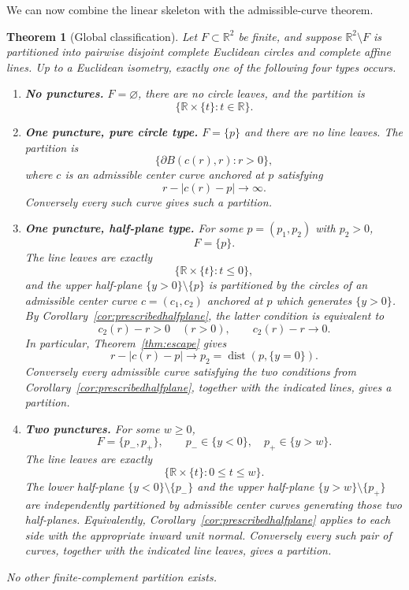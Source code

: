 \documentclass[11pt]{article}
\newtheorem{theorem}{Theorem}[section]
\newcommand{\R}{\mathbb{R}}
\DeclareMathOperator{\dist}{dist}
\begin{document}
We can now combine the linear skeleton with the admissible-curve theorem.

\begin{theorem}[Global classification]\label{thm:global}
Let $F\subset\R^2$ be finite, and suppose $\R^2\setminus F$ is partitioned into pairwise disjoint complete Euclidean circles and complete affine lines. Up to a Euclidean isometry, exactly one of the following four types occurs.

\begin{enumerate}[label=\textup{(\Roman*)},leftmargin=2.4em]
\item \textbf{No punctures.} $F=\varnothing$, there are no circle leaves, and the partition is
\[
\{\R\times\{t\}:t\in\R\}.
\]

\item \textbf{One puncture, pure circle type.} $F=\{p\}$ and there are no line leaves. The partition is
\[
\{\partial B(c(r),r):r>0\},
\]
where $c$ is an admissible center curve anchored at $p$ satisfying
\[
r-|c(r)-p|\longrightarrow\infty.
\]
Conversely every such curve gives such a partition.

\item \textbf{One puncture, half-plane type.} For some $p=(p_1,p_2)$ with $p_2>0$,
\[
F=\{p\}.
\]
The line leaves are exactly
\[
\{\R\times\{t\}:t\le0\},
\]
and the upper half-plane $\{y>0\}\setminus\{p\}$ is partitioned by the circles of an admissible center curve $c=(c_1,c_2)$ anchored at $p$ which generates $\{y>0\}$. By Corollary~\ref{cor:prescribedhalfplane}, the latter condition is equivalent to
\[
c_2(r)-r>0\quad(r>0),
\qquad
c_2(r)-r\longrightarrow0.
\]
In particular, Theorem~\ref{thm:escape} gives
\[
r-|c(r)-p|\longrightarrow p_2=\dist(p,\{y=0\}).
\]
Conversely every admissible curve satisfying the two conditions from Corollary~\ref{cor:prescribedhalfplane}, together with the indicated lines, gives a partition.

\item \textbf{Two punctures.} For some $w\ge0$,
\[
F=\{p_-,p_+\},
\qquad
p_-\in\{y<0\},
\quad
p_+\in\{y>w\}.
\]
The line leaves are exactly
\[
\{\R\times\{t\}:0\le t\le w\}.
\]
The lower half-plane $\{y<0\}\setminus\{p_-\}$ and the upper half-plane $\{y>w\}\setminus\{p_+\}$ are independently partitioned by admissible center curves generating those two half-planes. Equivalently, Corollary~\ref{cor:prescribedhalfplane} applies to each side with the appropriate inward unit normal. Conversely every such pair of curves, together with the indicated line leaves, gives a partition.
\end{enumerate}

No other finite-complement partition exists.
\end{theorem}
\end{document}
